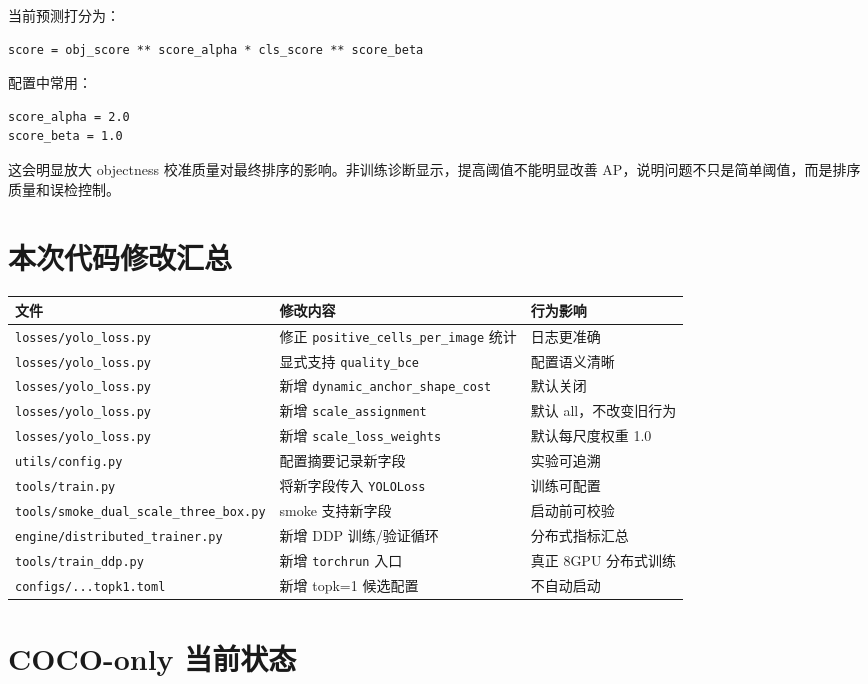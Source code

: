\documentclass[UTF8]{ctexart}
\begin{document}
当前预测打分为：

\begin{verbatim}
score = obj_score ** score_alpha * cls_score ** score_beta
\end{verbatim}

配置中常用：

\begin{verbatim}
score_alpha = 2.0
score_beta = 1.0
\end{verbatim}

这会明显放大 objectness 校准质量对最终排序的影响。非训练诊断显示，提高阈值不能明显改善 AP，说明问题不只是简单阈值，而是排序质量和误检控制。

\section{本次代码修改汇总}

\begin{longtable}{lll}
\toprule
文件 & 修改内容 & 行为影响 \\
\midrule
\texttt{losses/yolo\_loss.py} & 修正 \texttt{positive\_cells\_per\_image} 统计 & 日志更准确 \\
\texttt{losses/yolo\_loss.py} & 显式支持 \texttt{quality\_bce} & 配置语义清晰 \\
\texttt{losses/yolo\_loss.py} & 新增 \texttt{dynamic\_anchor\_shape\_cost} & 默认关闭 \\
\texttt{losses/yolo\_loss.py} & 新增 \texttt{scale\_assignment} & 默认 all，不改变旧行为 \\
\texttt{losses/yolo\_loss.py} & 新增 \texttt{scale\_loss\_weights} & 默认每尺度权重 1.0 \\
\texttt{utils/config.py} & 配置摘要记录新字段 & 实验可追溯 \\
\texttt{tools/train.py} & 将新字段传入 \texttt{YOLOLoss} & 训练可配置 \\
\texttt{tools/smoke\_dual\_scale\_three\_box.py} & smoke 支持新字段 & 启动前可校验 \\
\texttt{engine/distributed\_trainer.py} & 新增 DDP 训练/验证循环 & 分布式指标汇总 \\
\texttt{tools/train\_ddp.py} & 新增 \texttt{torchrun} 入口 & 真正 8GPU 分布式训练 \\
\texttt{configs/...topk1.toml} & 新增 topk=1 候选配置 & 不自动启动 \\
\bottomrule
\end{longtable}

\section{COCO-only 当前状态}
\end{document}
